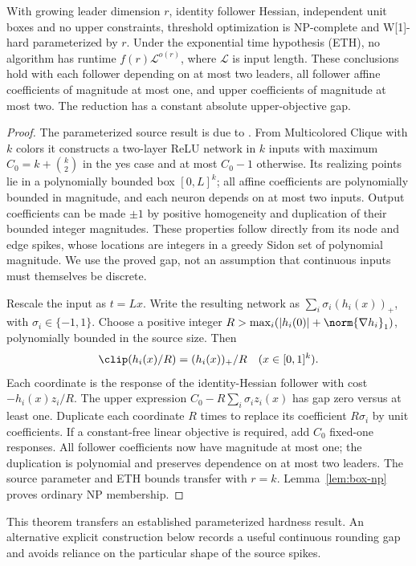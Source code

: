 \begin{theorem}\label{thm:growing-leader}
With growing leader dimension \(r\), identity follower Hessian, independent
unit boxes and no upper constraints, threshold optimization is NP-complete
and W[1]-hard parameterized by \(r\). Under the exponential time hypothesis
(ETH), no algorithm has runtime \(f(r)\mathcal L^{o(r)}\), where \(\mathcal L\)
is input length. These conclusions hold with each follower depending on at
most two leaders, all follower affine coefficients of magnitude at most one,
and upper coefficients of magnitude at most two. The reduction has a constant
absolute upper-objective gap.
\end{theorem}
\begin{proof}
The parameterized source result is due to
\citet[Proposition~4.1, Theorem~5.3 and Corollary~5.5]{FroeseEtAl2026}.
From Multicolored Clique with \(k\) colors it constructs a two-layer ReLU
network in \(k\) inputs with maximum \(C_0=k+\binom k2\) in the yes case and
at most \(C_0-1\) otherwise. Its realizing points lie in a polynomially bounded
box \([0,L]^k\); all affine coefficients are polynomially bounded in magnitude,
and each neuron depends on at most two inputs. Output coefficients can be
made \(\pm1\) by positive homogeneity and duplication of their bounded
integer magnitudes. These properties follow directly from its node and edge
spikes, whose locations are integers in a greedy Sidon set of polynomial
magnitude. We use the proved gap, not an assumption that continuous inputs
must themselves be discrete.

Rescale the input as \(t=Lx\). Write the resulting network as
\(\sum_i\sigma_i(h_i(x))_+\), with \(\sigma_i\in\{-1,1\}\). Choose a positive
integer \(R>\max_i(|h_i(0)|+\norm{\nabla h_i}_1)\), polynomially bounded in
the source size. Then
\[
 \clip(h_i(x)/R)=(h_i(x))_+/R\quad(x\in[0,1]^k).
\]
Each coordinate is the response of the identity-Hessian follower with cost
\(-h_i(x)z_i/R\). The upper expression
\(C_0-R\sum_i\sigma_i z_i(x)\) has gap zero versus at least one.
Duplicate each coordinate \(R\) times to replace its coefficient \(R\sigma_i\)
by unit coefficients. If a constant-free linear objective is required, add
\(C_0\) fixed-one responses. All follower coefficients now have magnitude at
most one; the duplication is polynomial and preserves dependence on at most
two leaders. The source parameter and ETH bounds transfer with \(r=k\).
Lemma~\ref{lem:box-np} proves ordinary NP membership.
\end{proof}
This theorem transfers an established parameterized hardness result. An
alternative explicit construction below records a useful continuous rounding
gap and avoids reliance on the particular shape of the source spikes.


